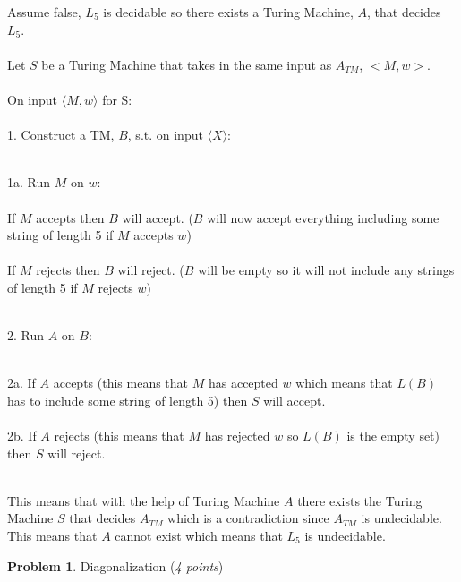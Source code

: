\documentclass[11pt]{article}
\theoremstyle{definition}
\theoremstyle{theorem}
\newtheorem{prob}{Problem}
\begin{document}
\noindent Assume false, $L_{5}$ is decidable so there exists a Turing Machine, $A$, that decides $L_{5}$. \\~\\
\noindent Let $S$ be a Turing Machine that takes in the same input as $A_{TM}$, $<M, w>$. \\~\\
\noindent On input $\langle M, w \rangle$ for S: \\~\\
\hangindent=0.7cm 1. Construct a TM, $B$, s.t. on input $\langle X \rangle$: \\~\\
\hspace*{0.9cm}
\begin{minipage}{.8\textwidth}
		1a. Run $M$ on $w$: \\~\\
		\indent If $M$ accepts then $B$ will accept. ($B$ will now accept everything including some string of length 5 if $M$ accepts $w$) \\~\\
		\indent If $M$ rejects then $B$ will reject. ($B$ will be empty so it will not include any strings of length 5 if $M$ rejects $w$) \\~\\
\end{minipage}

2. Run $A$ on $B$: \\~\\
\hspace*{0.9cm}
\begin{minipage}{.8\textwidth}
2a. If $A$ accepts (this means that $M$ has accepted $w$ which means that $L(B)$ has to include some string of length 5) then $S$ will accept. \\~\\
2b. If $A$ rejects (this means that $M$ has rejected $w$ so $L(B)$ is the empty set) then $S$ will reject. \\~\\
\end{minipage}

\noindent This means that with the help of Turing Machine $A$ there exists the Turing Machine $S$ that decides $A_{TM}$ which is a contradiction since $A_{TM}$ is undecidable. This means that $A$ cannot exist which means that $L_5$ is undecidable.




\newpage


\begin{prob} Diagonalization (\emph{4 points}) \end{prob}
\end{document}

